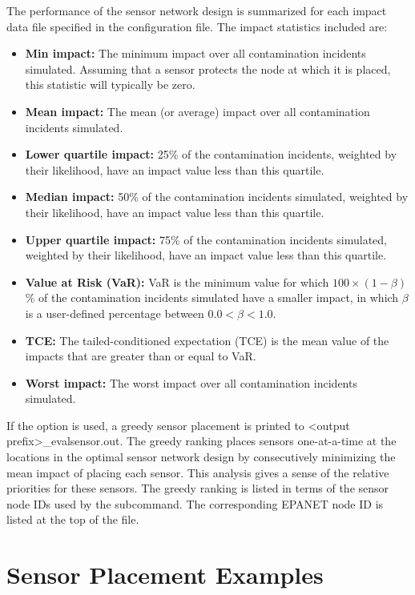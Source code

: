 The performance of the sensor network design is summarized for each impact data file 
specified in the configuration file. The impact statistics included are: 
\begin{itemize}
\item {\bfseries Min impact:} The minimum impact over all contamination
incidents simulated. Assuming that a sensor protects the node
at which it is placed, this statistic will typically be zero.
\item {\bfseries Mean impact:} The mean (or average) impact over all
contamination incidents simulated.
\item {\bfseries Lower quartile impact:} 25\% of the contamination incidents,
weighted by their likelihood, have an impact value less than this quartile.
\item {\bfseries Median impact:} 50\% of the contamination incidents simulated, weighted
by their likelihood, have an impact value less than this quartile.
\item {\bfseries Upper quartile impact:} 75\% of the contamination incidents simulated,
weighted by their likelihood, have an impact value less than this quartile.
\item {\bfseries Value at Risk (VaR):} VaR is the minimum value
for which $100\times(1-\beta)$\% of the contamination incidents simulated have a smaller
impact, in which $\beta$ is a user-defined percentage between $ 0.0 < \beta < 1.0$.
\item {\bfseries TCE:} The tailed-\/conditioned expectation (TCE)
is the mean value of the impacts that are greater than or equal to VaR.
\item {\bfseries Worst impact:} The worst impact over all contamination
incidents simulated.
\end{itemize}

If the  option is used, a greedy sensor placement is printed 
to <output prefix>\_evalsensor.out. The greedy ranking places sensors one-\/at-\/a-\/time at the locations 
in the optimal sensor network design by consecutively minimizing the mean impact 
of placing each sensor. This analysis gives a sense of the relative priorities for these
sensors. The greedy ranking is listed in terms of the sensor node IDs used by the 
 subcommand. The corresponding EPANET node ID is listed at the top of the file.

\section{Sensor Placement Examples}\label{sp_example}

